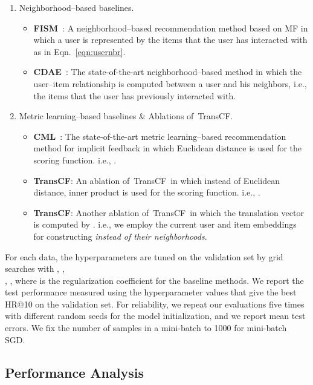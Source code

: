 \documentclass[conference]{IEEEtran}
\newcommand{\propose}{\textsf{{TransCF}}}
\newcommand{\proposealt}{\propose}
\newcommand{\proposedot}{\propose}
\begin{document}
\begin{enumerate}[leftmargin=0.5cm]
	\item Neighborhood--based baselines.
	\begin{itemize}
		\item \textbf{FISM}~\cite{kabbur2013fism}: A neighborhood--based recommendation method based on MF in which a user is represented by the items that the user has interacted with as in Eqn.~\ref{eqn:usernbr}.
		\item \textbf{CDAE}~\cite{wu2016collaborative}: The state-of-the-art neighborhood--based method in which the user--item relationship is computed between a user and his neighbors, i.e., the items that the user has previously interacted with.
	\end{itemize}
	\item Metric learning--based baselines \& Ablations of~\propose.
	\begin{itemize}
		\item \textbf{CML}~\cite{hsieh2017collaborative}: The state-of-the-art metric learning--based recommendation method for implicit feedback in which Euclidean distance is used for the scoring function. i.e., .
\item \textbf{\proposedot}: An ablation of~\propose~in which instead of Euclidean distance, inner product is used for the scoring function. i.e., .
		\item \textbf{\proposealt}: Another ablation of~\propose~in which the translation vector is computed by . i.e., we employ the current user and item embeddings for constructing  \textit{instead of their neighborhoods}. 
	\end{itemize}
\end{enumerate}


\medskip
{}
For each data, the hyperparameters are tuned on the validation set by grid searches with ,  , \\, , where  is the regularization coefficient for the baseline methods. 
We report the test performance measured using the hyperparameter values that give the best HR@10 on the validation set.
For reliability, we repeat our evaluations five times with different random seeds for the model initialization, and we report mean test errors.
We fix the number of samples in a mini-batch to 1000 for mini-batch SGD.


\subsection{Performance Analysis}
\label{exp:quant}
\end{document}
